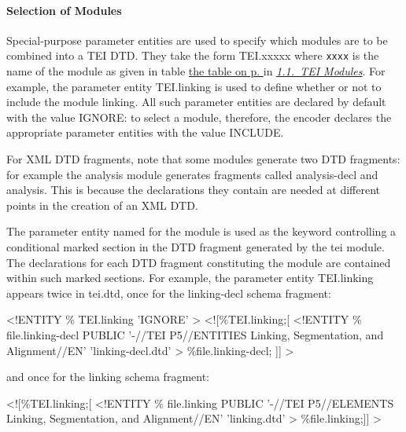 \paragraph[{Selection of Modules}]{Selection of Modules}\label{STPED}\par
Special-purpose parameter entities are used to specify which modules are to be combined into a TEI DTD. They take the form TEI.xxxxx where \texttt{xxxx} is the name of the module as given in table \hyperref[tab-mods]{the table on p. \pageref{tab-mods}} in \textit{\hyperref[STMA]{1.1.\ TEI Modules}}. For example, the parameter entity \textsf{TEI.linking} is used to define whether or not to include the module \textsf{linking}. All such parameter entities are declared by default with the value IGNORE: to select a module, therefore, the encoder declares the appropriate parameter entities with the value INCLUDE.\par
For XML DTD fragments, note that some modules generate two DTD fragments: for example the \textsf{analysis} module generates fragments called \textsf{analysis-decl} and \textsf{analysis}. This is because the declarations they contain are needed at different points in the creation of an XML DTD.\par
The parameter entity named for the module is used as the keyword controlling a conditional marked section in the DTD fragment generated by the \textsf{tei} module. The declarations for each DTD fragment constituting the module are contained within such marked sections. For example, the parameter entity \textsf{TEI.linking} appears twice in \textsf{tei.dtd}, once for the \textsf{linking-decl} schema fragment: \par\hfill\bgroup\exampleFont\vskip 10pt\begin{shaded}
\obeyspaces <!ENTITY \% TEI.linking 'IGNORE' >\newline
<![\%TEI.linking;[\newline
<!ENTITY \% file.linking-decl PUBLIC '-//TEI P5//ENTITIES Linking, Segmentation, and Alignment//EN' 'linking-decl.dtd' >\newline
\%file.linking-decl;\newline
]] >\end{shaded}
\par\egroup 
 and once for the \textsf{linking} schema fragment: \par\hfill\bgroup\exampleFont\vskip 10pt\begin{shaded}
\obeyspaces <![\%TEI.linking;[\newline
<!ENTITY \% file.linking PUBLIC '-//TEI P5//ELEMENTS Linking, Segmentation, and Alignment//EN' 'linking.dtd' >\newline
\%file.linking;]] >\end{shaded}
